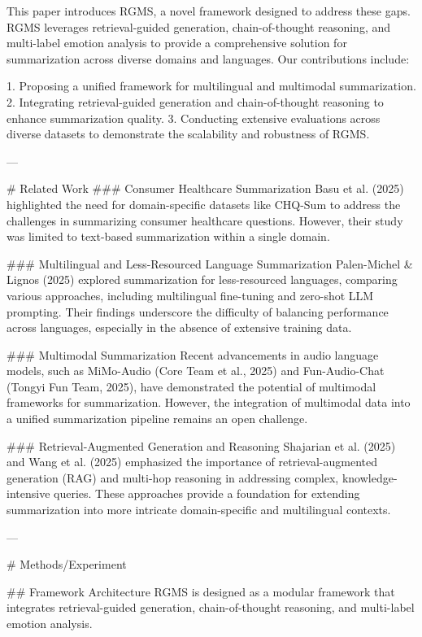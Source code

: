 This paper introduces RGMS, a novel framework designed to address these gaps. RGMS leverages retrieval-guided generation, chain-of-thought reasoning, and multi-label emotion analysis to provide a comprehensive solution for summarization across diverse domains and languages. Our contributions include:  

1. Proposing a unified framework for multilingual and multimodal summarization.  
2. Integrating retrieval-guided generation and chain-of-thought reasoning to enhance summarization quality.  
3. Conducting extensive evaluations across diverse datasets to demonstrate the scalability and robustness of RGMS.  

---

# Related Work  
### Consumer Healthcare Summarization  
Basu et al. (2025) highlighted the need for domain-specific datasets like CHQ-Sum to address the challenges in summarizing consumer healthcare questions. However, their study was limited to text-based summarization within a single domain.  

### Multilingual and Less-Resourced Language Summarization  
Palen-Michel & Lignos (2025) explored summarization for less-resourced languages, comparing various approaches, including multilingual fine-tuning and zero-shot LLM prompting. Their findings underscore the difficulty of balancing performance across languages, especially in the absence of extensive training data.  

### Multimodal Summarization  
Recent advancements in audio language models, such as MiMo-Audio (Core Team et al., 2025) and Fun-Audio-Chat (Tongyi Fun Team, 2025), have demonstrated the potential of multimodal frameworks for summarization. However, the integration of multimodal data into a unified summarization pipeline remains an open challenge.  

### Retrieval-Augmented Generation and Reasoning  
Shajarian et al. (2025) and Wang et al. (2025) emphasized the importance of retrieval-augmented generation (RAG) and multi-hop reasoning in addressing complex, knowledge-intensive queries. These approaches provide a foundation for extending summarization into more intricate domain-specific and multilingual contexts.  

---

# Methods/Experiment  

## Framework Architecture  
RGMS is designed as a modular framework that integrates retrieval-guided generation, chain-of-thought reasoning, and multi-label emotion analysis.  

